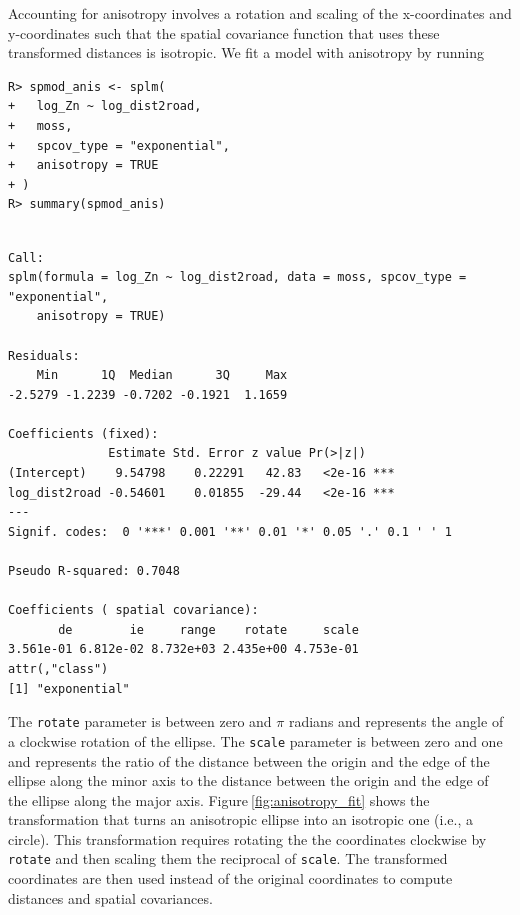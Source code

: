 \documentclass{article}
\begin{document}
Accounting for anisotropy involves a rotation and scaling of the
x-coordinates and y-coordinates such that the spatial covariance
function that uses these transformed distances is isotropic. We fit a
model with anisotropy by running

\begin{verbatim}
R> spmod_anis <- splm(
+   log_Zn ~ log_dist2road,
+   moss,
+   spcov_type = "exponential",
+   anisotropy = TRUE
+ )
R> summary(spmod_anis)
\end{verbatim}

\begin{verbatim}

Call:
splm(formula = log_Zn ~ log_dist2road, data = moss, spcov_type = "exponential", 
    anisotropy = TRUE)

Residuals:
    Min      1Q  Median      3Q     Max 
-2.5279 -1.2239 -0.7202 -0.1921  1.1659 

Coefficients (fixed):
              Estimate Std. Error z value Pr(>|z|)    
(Intercept)    9.54798    0.22291   42.83   <2e-16 ***
log_dist2road -0.54601    0.01855  -29.44   <2e-16 ***
---
Signif. codes:  0 '***' 0.001 '**' 0.01 '*' 0.05 '.' 0.1 ' ' 1

Pseudo R-squared: 0.7048

Coefficients ( spatial covariance):
       de        ie     range    rotate     scale 
3.561e-01 6.812e-02 8.732e+03 2.435e+00 4.753e-01 
attr(,"class")
[1] "exponential"
\end{verbatim}

The \texttt{rotate} parameter is between zero and \(\pi\) radians and
represents the angle of a clockwise rotation of the ellipse. The
\texttt{scale} parameter is between zero and one and represents the
ratio of the distance between the origin and the edge of the ellipse
along the minor axis to the distance between the origin and the edge of
the ellipse along the major axis. Figure\(~\)\ref{fig:anisotropy_fit}
shows the transformation that turns an anisotropic ellipse into an
isotropic one (i.e., a circle). This transformation requires rotating
the the coordinates clockwise by \texttt{rotate} and then scaling them
the reciprocal of \texttt{scale}. The transformed coordinates are then
used instead of the original coordinates to compute distances and
spatial covariances.
\end{document}
